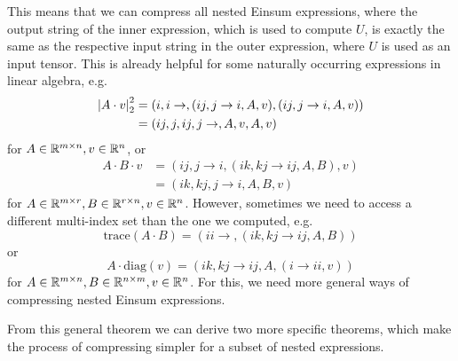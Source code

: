 

This means that we can compress all nested Einsum expressions, where the output string of the inner expression, which is used to compute $U$, is exactly the same as the respective input string in the outer expression, where $U$ is used as an input tensor.
This is already helpful for some naturally occurring expressions in linear algebra, e.g.
\begin{align*}
    \left\lvert A \cdot v \right\rvert_2^2 & = (i,i\rightarrow,(ij, j \rightarrow i, A, v),(ij, j \rightarrow i, A, v)) \\
                        & = (ij,j,ij,j\rightarrow,A,v,A,v)
\end{align*}
for $A \in \mathbb{R}^{m \times n}, v \in \mathbb{R}^{n}$, or
\begin{align*}
    A \cdot B \cdot v & = (ij, j \rightarrow i, (ik, kj \rightarrow ij, A, B), v) \\
                      & = (ik,kj,j \rightarrow i, A, B, v)
\end{align*}
for $A \in \mathbb{R}^{m \times r}, B \in \mathbb{R}^{r \times n}, v \in \mathbb{R}^n$.
However, sometimes we need to access a different multi-index set than the one we computed, e.g.
$$\text{trace}(A \cdot B) = (ii \rightarrow, (ik, kj \rightarrow ij, A, B))$$
or
$$A \cdot \text{diag}(v) = (ik, kj \rightarrow ij, A, (i \rightarrow ii, v))$$
for $A \in \mathbb{R}^{m \times n}, B \in \mathbb{R}^{n \times m}, v \in \mathbb{R}^{n}$.
For this, we need more general ways of compressing nested Einsum expressions.



From this general theorem we can derive two more specific theorems,
which make the process of compressing simpler for a subset of nested expressions.



